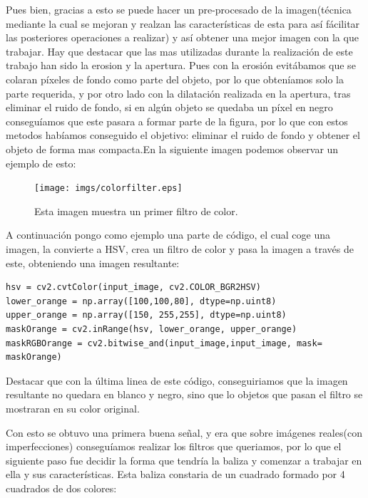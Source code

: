 \hspace{1cm} Pues bien, gracias a esto se puede hacer un pre-procesado de la imagen(t\'ecnica mediante la cual se mejoran y realzan las caracter\'isticas de esta para as\'i f\'acilitar las posteriores operaciones a realizar) y as\'i obtener una mejor imagen con la que trabajar. Hay que destacar que las mas utilizadas durante la realizaci\'on de este trabajo han sido la erosion y la apertura. Pues con la erosi\'on evit\'abamos que se colaran p\'ixeles de fondo como parte del objeto, por lo que obten\'iamos solo la parte requerida, y por otro lado con la dilataci\'on realizada en la apertura, tras eliminar el ruido de fondo, si en alg\'un objeto se quedaba un p\'ixel en negro consegu\'iamos que este pasara a formar parte de la figura, por lo que con estos metodos hab\'iamos conseguido el objetivo: eliminar el ruido de fondo y obtener el objeto de forma mas compacta.En la siguiente imagen podemos observar un ejemplo de esto:

\begin{figure}[ht]
	\centering
		\texttt{[image: imgs/colorfilter.eps]}
		\caption{Esta imagen muestra un primer filtro de color.}
	\label{fig:ColorFilter}
\end{figure}

\hspace{1cm} A continuaci\'on pongo como ejemplo una parte de c\'odigo, el cual coge una imagen, la convierte a HSV, crea un filtro de color y pasa la imagen a trav\'es de este, obteniendo una imagen resultante:
\begin{verbatim}
hsv = cv2.cvtColor(input_image, cv2.COLOR_BGR2HSV)
lower_orange = np.array([100,100,80], dtype=np.uint8)
upper_orange = np.array([150, 255,255], dtype=np.uint8)
maskOrange = cv2.inRange(hsv, lower_orange, upper_orange)
maskRGBOrange = cv2.bitwise_and(input_image,input_image, mask= maskOrange)
\end{verbatim}
\hspace{1 cm} Destacar que con la \'ultima linea de este c\'odigo, conseguiriamos que la imagen resultante no quedara en blanco y negro, sino que lo objetos que pasan el filtro se mostraran en su color original. 

\hspace{1 cm} Con esto se obtuvo una primera buena señal, y era que sobre im\'agenes reales(con imperfecciones) consegu\'iamos realizar los filtros que queriamos, por lo que el siguiente paso fue decidir la forma que tendr\'ia la baliza y comenzar a trabajar en ella y sus caracter\'isticas. Esta baliza constaria de un cuadrado formado por 4 cuadrados de dos colores: 

